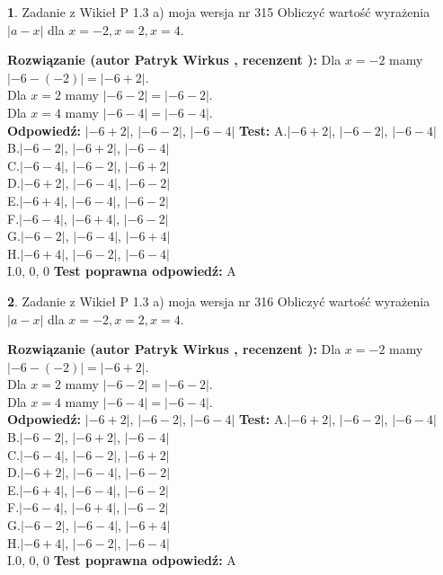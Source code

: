 \documentclass[12pt, a4paper]{article}
\theoremstyle{definition} %
\newtheorem{zad}{}
\newcommand{\zadStart}[1]{\begin{zad}#1\newline}
\newcommand{\zadStop}{\end{zad}}
\newcommand{\rozwStart}[2]{\noindent \textbf{Rozwiązanie (autor #1 , recenzent #2): }\newline}
\newcommand{\rozwStop}{\newline}
\newcommand{\odpStart}{\noindent \textbf{Odpowiedź:}\newline}
\newcommand{\odpStop}{\newline}
\newcommand{\testStart}{\noindent \textbf{Test:}\newline}
\newcommand{\testStop}{\newline}
\newcommand{\kluczStart}{\noindent \textbf{Test poprawna odpowiedź:}\newline}
\newcommand{\kluczStop}{\newline}
\begin{document}
\zadStart{Zadanie z Wikieł P 1.3 a) moja wersja nr 315}
Obliczyć wartość wyrażenia $|a - x|$ dla $x=-2,x=2,x=4$.
\zadStop
\rozwStart{Patryk Wirkus}{}
Dla $x = -2$ mamy $|-6 - (-2)| = |-6 + 2|$.\\
Dla $x = 2$ mamy $|-6 - 2| = |-6 - 2|$.\\
Dla $x = 4$ mamy $|-6 - 4| = |-6 - 4|$.\\
\rozwStop
\odpStart
$|-6 + 2|$, $|-6 - 2|$, $|-6 - 4|$
\odpStop
\testStart
A.$|-6 + 2|$, $|-6 - 2|$, $|-6 - 4|$\\
B.$|-6 - 2|$, $|-6 + 2|$, $|-6 - 4|$\\
C.$|-6 - 4|$, $|-6 - 2|$, $|-6 + 2|$\\
D.$|-6 + 2|$, $|-6 - 4|$, $|-6 - 2|$\\
E.$|-6 + 4|$, $|-6 - 4|$, $|-6 - 2|$\\
F.$|-6 - 4|$, $|-6 + 4|$, $|-6 - 2|$\\
G.$|-6 - 2|$, $|-6 - 4|$, $|-6 + 4|$\\
H.$|-6 + 4|$, $|-6 - 2|$, $|-6 - 4|$\\
I.$0$, $0$, $0$
\testStop
\kluczStart
A
\kluczStop



\zadStart{Zadanie z Wikieł P 1.3 a) moja wersja nr 316}
Obliczyć wartość wyrażenia $|a - x|$ dla $x=-2,x=2,x=4$.
\zadStop
\rozwStart{Patryk Wirkus}{}
Dla $x = -2$ mamy $|-6 - (-2)| = |-6 + 2|$.\\
Dla $x = 2$ mamy $|-6 - 2| = |-6 - 2|$.\\
Dla $x = 4$ mamy $|-6 - 4| = |-6 - 4|$.\\
\rozwStop
\odpStart
$|-6 + 2|$, $|-6 - 2|$, $|-6 - 4|$
\odpStop
\testStart
A.$|-6 + 2|$, $|-6 - 2|$, $|-6 - 4|$\\
B.$|-6 - 2|$, $|-6 + 2|$, $|-6 - 4|$\\
C.$|-6 - 4|$, $|-6 - 2|$, $|-6 + 2|$\\
D.$|-6 + 2|$, $|-6 - 4|$, $|-6 - 2|$\\
E.$|-6 + 4|$, $|-6 - 4|$, $|-6 - 2|$\\
F.$|-6 - 4|$, $|-6 + 4|$, $|-6 - 2|$\\
G.$|-6 - 2|$, $|-6 - 4|$, $|-6 + 4|$\\
H.$|-6 + 4|$, $|-6 - 2|$, $|-6 - 4|$\\
I.$0$, $0$, $0$
\testStop
\kluczStart
A
\kluczStop
\end{document}
